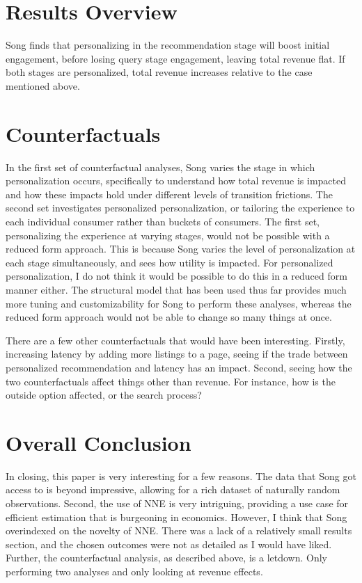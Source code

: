 \documentclass[11pt]{article}
\theoremstyle{definition}
\theoremstyle{remark}
\begin{document}
\section{Results Overview}

Song finds that personalizing in the recommendation stage will boost initial engagement, before losing query stage engagement, leaving total revenue flat. If both stages are personalized,
total revenue increases relative to the case mentioned above.

\section{Counterfactuals}

In the first set of counterfactual analyses, Song varies the stage in which personalization occurs, specifically to understand how total revenue is impacted and how these impacts
hold under different levels of transition frictions. The second set investigates personalized personalization, or tailoring the experience to each individual consumer rather than 
buckets of consumers. The first set, personalizing the experience at varying stages, would not be possible with a reduced form approach. This is because Song varies the level
of personalization at each stage simultaneously, and sees how utility is impacted. For personalized personalization, I do not think it would be possible to do this in a reduced form
manner either. The structural model that has been used thus far provides much more tuning and customizability for Song to perform these analyses, whereas the reduced form approach
would not be able to change so many things at once.

There are a few other counterfactuals that would have been interesting. Firstly, increasing latency by adding more listings to a page, seeing if the trade between personalized recommendation
and latency has an impact. Second, seeing how the two counterfactuals affect things other than revenue. For instance, how is the outside option affected, or the search process?

\section{Overall Conclusion}

In closing, this paper is very interesting for a few reasons. The data that Song got access to is beyond impressive, allowing for a rich dataset of naturally random observations. Second, the
use of NNE is very intriguing, providing a use case for efficient estimation that is burgeoning in economics. However, I think that Song overindexed on the novelty of NNE. There was a lack of 
a relatively small results section, and the chosen outcomes were not as detailed as I would have liked. Further, the counterfactual analysis, as described above, is a letdown. Only performing 
two analyses and only looking at revenue effects. 
\end{document}
